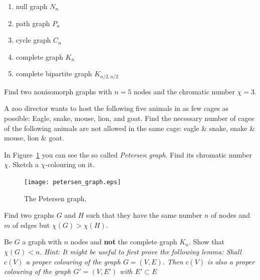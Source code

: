 \begin{enumerate}
\item null graph $N_n$
\item path graph $P_n$
\item cycle graph $C_n$
\item complete graph $K_n$
\item complete bipartite graph $K_{n/2,n/2}$
\end{enumerate}

\subexercise[%
  topic=Chromatic Number,
    ]
 
 Find two nonisomorph graphs with $n=5$ nodes and the chromatic number $\chi=3$.   
 

\subexercise[%
  topic=Zoo director,
    ]
  
  A zoo director wants to host the following five animals in as few cages as possible: Eagle, snake, mouse, lion, and goat. Find the necessary number of cages of the following animals are not allowed in the same cage: eagle \& snake, snake \& mouse, lion \& goat. 
  

\subexercise[%
  topic=Petersen Graph,
    ]
    
In Figure~\ref{petersen} you can see the so called \emph{Petersen graph}. Find its chromatic number $\chi$. Sketch a  $\chi$-colouring on it.    
    
\begin{figure}[h]
    \centering
    \texttt{[image: petersen\_graph.eps]}
    \caption{\label{petersen} The Petersen graph.}

\end{figure}



\subexercise[%
  topic=Graphs of Different Size but Same Chromatic Number
    ]
		
	Find two graphs $G$ and $H$ such that they have the same number $n$ of nodes and $m$ of edges but $\chi (G)> \chi (H)$.



\subexercise[%
  topic=An upper bound for the chromatic number,
    ]
    
Be $G$ a graph with $n$ nodes and {\bf not} the complete graph $K_n$. Show that $\chi (G) < n$. \emph{Hint: It might be useful to first prove the following lemma: Shall $c(V)$ a proper colouring of the graph $G=(V,E)$. Then $c(V)$ is also a proper colouring of the graph $G'=(V,E')$ with $E'\subset E$ }
    


